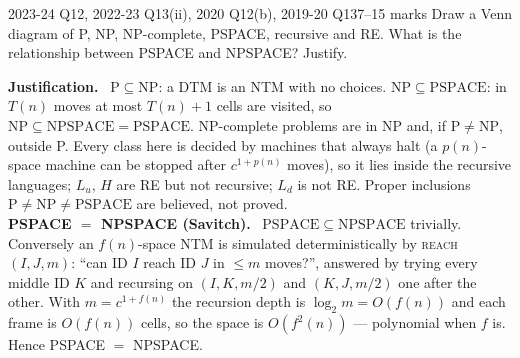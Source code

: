 \documentclass[10.5pt,a4paper]{article}
\newcommand{\ansh}[1]{\textbf{\color{exborder}#1}\ }
\newcommand{\NP}{\mathrm{NP}}
\renewcommand{\P}{\mathrm{P}}
\newcommand{\PS}{\mathrm{PSPACE}}
\begin{document}
\begin{examq}{2023-24 Q12, 2022-23 Q13(ii), 2020 Q12(b), 2019-20 Q13}{7--15 marks}
Draw a Venn diagram of P, NP, NP-complete, PSPACE, recursive and RE. What is the relationship between PSPACE and NPSPACE? Justify.
\tcblower
\begin{center}
\end{center}
\ansh{Justification.} $\P\subseteq\NP$: a DTM is an NTM with no choices. $\NP\subseteq\PS$: in $T(n)$ moves at most $T(n)+1$ cells are visited,
so $\NP\subseteq\mathrm{NPSPACE}=\PS$. NP-complete problems are in NP and, if $\P\ne\NP$, outside P. Every class here is decided by machines that
always halt (a $p(n)$-space machine can be stopped after $c^{1+p(n)}$ moves), so it lies inside the recursive languages; $L_u$, $H$ are RE but not
recursive; $L_d$ is not RE. Proper inclusions $\P\ne\NP\ne\PS$ are believed, not proved.\\
\ansh{PSPACE $=$ NPSPACE (Savitch).} $\PS\subseteq\mathrm{NPSPACE}$ trivially. Conversely an $f(n)$-space NTM is simulated deterministically
by \textsc{reach}$(I,J,m)$: ``can ID $I$ reach ID $J$ in $\le m$ moves?'', answered by trying every middle ID $K$ and recursing on $(I,K,m/2)$
and $(K,J,m/2)$ one after the other. With $m=c^{1+f(n)}$ the recursion depth is $\log_2 m=O(f(n))$ and each frame is $O(f(n))$ cells, so the
space is $O(f^2(n))$ --- polynomial when $f$ is. Hence PSPACE $=$ NPSPACE.
\end{examq}
\end{document}
